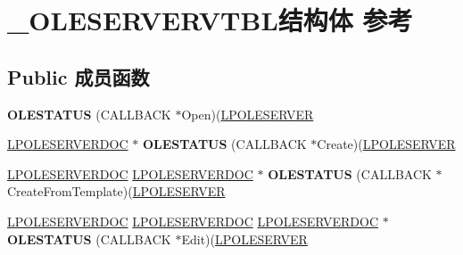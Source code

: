 \hypertarget{struct___o_l_e_s_e_r_v_e_r_v_t_b_l}{}\section{\+\_\+\+O\+L\+E\+S\+E\+R\+V\+E\+R\+V\+T\+B\+L结构体 参考}
\label{struct___o_l_e_s_e_r_v_e_r_v_t_b_l}
\subsection*{Public 成员函数}
\begin{DoxyCompactItemize}
\item 
\mbox{\label{struct___o_l_e_s_e_r_v_e_r_v_t_b_l_a65193bc1876e4db5c930f3b387df60a5}} 
{\bfseries O\+L\+E\+S\+T\+A\+T\+US} (C\+A\+L\+L\+B\+A\+CK $\ast$Open)(\hyperlink{struct___o_l_e_s_e_r_v_e_r}{L\+P\+O\+L\+E\+S\+E\+R\+V\+ER}
\item 
\mbox{\label{struct___o_l_e_s_e_r_v_e_r_v_t_b_l_af33dde15399189f4ca6f25b3ac28c1dd}} 
\hyperlink{struct___o_l_e_s_e_r_v_e_r_d_o_c}{L\+P\+O\+L\+E\+S\+E\+R\+V\+E\+R\+D\+OC} $\ast$ {\bfseries O\+L\+E\+S\+T\+A\+T\+US} (C\+A\+L\+L\+B\+A\+CK $\ast$Create)(\hyperlink{struct___o_l_e_s_e_r_v_e_r}{L\+P\+O\+L\+E\+S\+E\+R\+V\+ER}
\item 
\mbox{\label{struct___o_l_e_s_e_r_v_e_r_v_t_b_l_a4b67d273b7aee420ffd13ee1e6498186}} 
\hyperlink{struct___o_l_e_s_e_r_v_e_r_d_o_c}{L\+P\+O\+L\+E\+S\+E\+R\+V\+E\+R\+D\+OC} \hyperlink{struct___o_l_e_s_e_r_v_e_r_d_o_c}{L\+P\+O\+L\+E\+S\+E\+R\+V\+E\+R\+D\+OC} $\ast$ {\bfseries O\+L\+E\+S\+T\+A\+T\+US} (C\+A\+L\+L\+B\+A\+CK $\ast$Create\+From\+Template)(\hyperlink{struct___o_l_e_s_e_r_v_e_r}{L\+P\+O\+L\+E\+S\+E\+R\+V\+ER}
\item 
\mbox{\label{struct___o_l_e_s_e_r_v_e_r_v_t_b_l_a5491437fb44033635cff46a1431d795f}} 
\hyperlink{struct___o_l_e_s_e_r_v_e_r_d_o_c}{L\+P\+O\+L\+E\+S\+E\+R\+V\+E\+R\+D\+OC} \hyperlink{struct___o_l_e_s_e_r_v_e_r_d_o_c}{L\+P\+O\+L\+E\+S\+E\+R\+V\+E\+R\+D\+OC} \hyperlink{struct___o_l_e_s_e_r_v_e_r_d_o_c}{L\+P\+O\+L\+E\+S\+E\+R\+V\+E\+R\+D\+OC} $\ast$ {\bfseries O\+L\+E\+S\+T\+A\+T\+US} (C\+A\+L\+L\+B\+A\+CK $\ast$Edit)(\hyperlink{struct___o_l_e_s_e_r_v_e_r}{L\+P\+O\+L\+E\+S\+E\+R\+V\+ER}

\end{DoxyCompactItemize}
